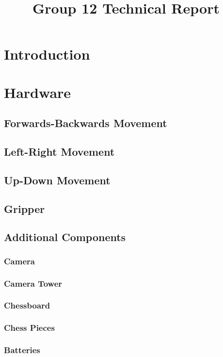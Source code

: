 \documentclass[onecolumn]{IEEEtran}
\begin{document}


\title{Group 12 Technical Report}
\maketitle

\section{Introduction}
\section{Hardware}
\subsection{Forwards-Backwards Movement}
\subsection{Left-Right Movement}
\subsection{Up-Down Movement}
\subsection{Gripper}
\subsection{Additional Components}
\subsubsection{Camera}
\subsubsection{Camera Tower}
\subsubsection{Chessboard}
\subsubsection{Chess Pieces}
\subsubsection{Batteries}
\end{document}
